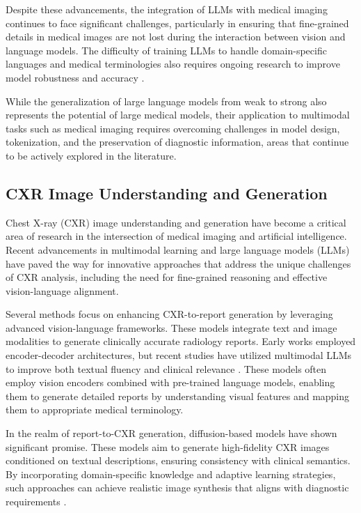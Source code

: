 Despite these advancements, the integration of LLMs with medical imaging continues to face significant challenges, particularly in ensuring that fine-grained details in medical images are not lost during the interaction between vision and language models. The difficulty of training LLMs to handle domain-specific languages and medical terminologies also requires ongoing research to improve model robustness and accuracy \cite{huang2024video}. 

While the generalization of large language models from weak to strong \cite{zhou2025weak} also represents the potential of large medical models, their application to multimodal tasks such as medical imaging requires overcoming challenges in model design, tokenization, and the preservation of diagnostic information, areas that continue to be actively explored in the literature.

\subsection{CXR Image Understanding and Generation}

Chest X-ray (CXR) image understanding and generation have become a critical area of research in the intersection of medical imaging and artificial intelligence. Recent advancements in multimodal learning and large language models (LLMs) have paved the way for innovative approaches that address the unique challenges of CXR analysis, including the need for fine-grained reasoning and effective vision-language alignment.

Several methods focus on enhancing CXR-to-report generation by leveraging advanced vision-language frameworks. These models integrate text and image modalities to generate clinically accurate radiology reports. Early works employed encoder-decoder architectures, but recent studies have utilized multimodal LLMs to improve both textual fluency and clinical relevance \cite{kang2024wolf, kang2024wolf, lee2023llmcxr}. These models often employ vision encoders combined with pre-trained language models, enabling them to generate detailed reports by understanding visual features and mapping them to appropriate medical terminology.

In the realm of report-to-CXR generation, diffusion-based models have shown significant promise. These models aim to generate high-fidelity CXR images conditioned on textual descriptions, ensuring consistency with clinical semantics. By incorporating domain-specific knowledge and adaptive learning strategies, such approaches can achieve realistic image synthesis that aligns with diagnostic requirements \cite{huang2024diffcxr, han2024advancing}.


